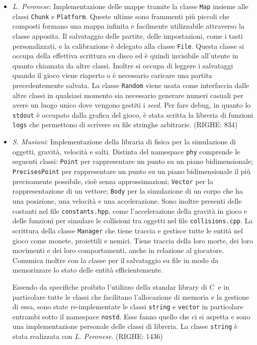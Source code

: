 \documentclass[a4paper]{article}
\def\CC{{C\nolinebreak[4]\hspace{-.05em}\raisebox{.4ex}{\tiny\bf ++}}}
\begin{document}
\begin{itemize}
  \item \emph{L. Peronese}: Implementazione delle mappe tramite la classe 
    \texttt{Map} insieme alle classi \texttt{Chunk} e \texttt{Platform}. Queste 
    ultime sono frammenti più piccoli che composti formano una mappa infinita  e 
    facilmente utilizzabile attraverso la classe apposita. Il salvataggio delle 
    partite, delle impostazioni, come i tasti personalizzati, e la calibrazione 
    è delegato alla classe \texttt{File}. Questa classe si occupa della 
    effettiva scrittura su disco ed è quindi invisibile all'utente in quanto 
    chiamata da altre classi. Inoltre si occupa di leggere i salvataggi quando 
    il gioco viene riaperto o è necessario caricare una partita precedentemente 
    salvata. La classe \texttt{Random} viene usata come interfaccia dalle altre
    classi in qualsiasi momento sia necessario generare numeri casuali per avere
    un luogo unico dove vengono gestiti i \emph{seed}. Per fare debug, in quanto
    lo \texttt{stdout} è occupato dalla grafica del gioco, è stata scritta la 
    libreria di funzioni \texttt{logs} che permettono di scrivere su file 
    stringhe arbitrarie. (RIGHE: 834)

  \item \emph{S. Musiani}: Implementazione della libraria di fisica per la 
    simulazione di oggetti, gravità, velocità e salti. Distinta del namespace 
    \texttt{phy} comprende le seguenti classi: \texttt{Point} per rappresentare 
    un punto su un piano bidimensionale; \texttt{PrecisesPoint} per 
    rappresentare un punto su un piano bidimensionale il più precisamente 
    possibile, cioè senza approssimazioni; \texttt{Vector} per la 
    rappresentazione di un vettore; \texttt{Body} per la simulazione di un 
    corpo che ha una posizione, una velocità e una accelerazione. Sono inoltre 
    presenti delle costanti nel file \texttt{constants.hpp}, come 
    l'accelerazione della gravità in gioco e delle funzioni per simulare le 
    collisioni tra oggetti nel file \texttt{collisions.cpp}. La scrittura della 
    classe \texttt{Manager} che tiene traccia e gestisce tutte le entità nel 
    gioco come monete, proiettili e nemici. Tiene traccia della loro morte, dei 
    loro movimenti e dei loro comportamenti, anche in relazione al giocatore. 
    Comunica inoltre con la classe per il salvataggio su file in modo da 
    memorizzare lo stato delle entità efficientemente.

    Essendo da specifiche proibito l'utilizzo della standar library di \CC\ e in
    particolare tutte le classi che facilitano l'allocazione di memoria e la 
    gestione di essa, sono state re-implementate le classi \texttt{string} e 
    \texttt{vector} in particolare entrambi sotto il namespace \texttt{nostd}. 
    Esse fanno quello che ci si aspetta e sono una implementazione personale 
    delle classi di libreria. La classe \texttt{string} è stata realizzata con 
    \emph{L. Peronese}. (RIGHE: 1436)
\end{itemize}
\end{document}
